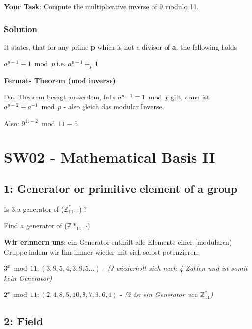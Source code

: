 \documentclass[11pt]{article}
\begin{document}
\textbf{Your Task}: Compute the multiplicative inverse of 9 modulo 11.

\hypertarget{solution}{%
\subsubsection{Solution}\label{solution}}

It states, that for any prime \textbf{p} which is not a divisor of
\textbf{a}, the following holds

\(a^{p-1} \equiv 1 \bmod p\) i.e. \(a^{p-1} \equiv_{p} 1\)

\textbf{Fermats Theorem (mod inverse)}

Das Theorem besagt ausserdem, falls \(a^{p-1} \equiv 1 \bmod p\) gilt,
dann ist \(a^{p-2} \equiv a^{-1} \bmod p\) - also gleich das modular
Inverse.

Also: \(9^{11-2} \bmod 11 \equiv 5\)

    

    \hypertarget{sw02---mathematical-basis-ii}{%
\section{SW02 - Mathematical Basis
II}\label{sw02---mathematical-basis-ii}}

    \hypertarget{generator-or-primitive-element-of-a-group}{%
\subsection{1: Generator or primitive element of a
group}\label{generator-or-primitive-element-of-a-group}}

Is 3 a generator of (\(\mathbb{Z}^{*}_{11}, \cdot\)) ?

Find a generator of (\(\mathbb{Z}*_{11}, \cdot\))

\textbf{Wir erinnern uns}: ein Generator enthält alle Elemente einer
(modularen) Gruppe indem wir Ihn immer wieder mit sich selbst
potenzieren.

\(3^{x} \bmod 11 : (3, 9, 5, 4, 3, 9, 5...)\) - \emph{(3 wiederholt sich
nach 4 Zahlen und ist somit kein Generator)}

\(2^{x} \bmod 11 : (2, 4, 8, 5, 10, 9, 7, 3, 6, 1)\) - \emph{(2 ist ein
Generator von \(\mathbb{Z}^{*}_{11}\))}

    \hypertarget{field}{%
\subsection{2: Field}\label{field}}
\end{document}
